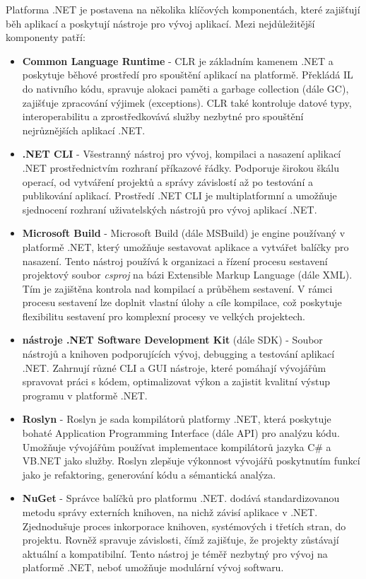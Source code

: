 
Platforma .NET je postavena na několika klíčových komponentách, které zajišťují běh aplikací a poskytují nástroje pro vývoj aplikací. Mezi nejdůležitější komponenty patří:

\begin{itemize}
    \item \textbf{Common Language Runtime} - CLR je základním kamenem .NET a poskytuje běhové prostředí pro spouštění aplikací na platformě. Překládá IL do nativního kódu, spravuje alokaci paměti a garbage collection (dále GC), zajišťuje zpracování výjimek (exceptions). CLR také kontroluje datové typy, interoperabilitu a zprostředkovává služby nezbytné pro spouštění nejrůznějších aplikací .NET.
    \item \textbf{.NET CLI} - Všestranný nástroj pro vývoj, kompilaci a nasazení aplikací .NET prostřednictvím rozhraní příkazové řádky. Podporuje širokou škálu operací, od vytváření projektů a správy závislostí až po testování a publikování aplikací. Prostředí .NET CLI je multiplatformní a umožňuje sjednocení rozhraní uživatelských nástrojů pro vývoj aplikací .NET.
    \item \textbf{Microsoft Build} - Microsoft Build (dále MSBuild) je engine používaný v platformě .NET, který umožňuje sestavovat aplikace a vytvářet balíčky pro nasazení. Tento nástroj používá k organizaci a řízení procesu sestavení projektový soubor \emph{csproj} na bázi Extensible Markup Language (dále XML). Tím je zajištěna kontrola nad kompilací a průběhem sestavení. V rámci procesu sestavení lze doplnit vlastní úlohy a cíle kompilace, což poskytuje flexibilitu sestavení pro komplexní procesy ve velkých projektech.
    \item \textbf{nástroje .NET Software Development Kit} (dále SDK) - Soubor nástrojů a knihoven podporujících vývoj, debugging a testování aplikací .NET. Zahrnují různé CLI a GUI nástroje, které pomáhají vývojářům spravovat práci s kódem, optimalizovat výkon a zajistit kvalitní výstup programu v platformě .NET.
    \item \textbf{Roslyn} - Roslyn je sada kompilátorů platformy .NET, která poskytuje bohaté Application Programming Interface (dále API) pro analýzu kódu. Umožňuje vývojářům používat implementace kompilátorů jazyka C\# a VB.NET jako služby. Roslyn zlepšuje výkonnost vývojářů poskytnutím funkcí jako je refaktoring, generování kódu a sémantická analýza.
    \item \textbf{NuGet} - Správce balíčků pro platformu .NET. dodává standardizovanou metodu správy externích knihoven, na nichž závisí aplikace v .NET. Zjednodušuje proces inkorporace knihoven, systémových i třetích stran, do projektu. Rovněž spravuje závislosti, čímž zajišťuje, že projekty zůstávají aktuální a kompatibilní. Tento nástroj je téměř nezbytný pro vývoj na platformě .NET, neboť umožňuje modulární vývoj softwaru. \cite{netdocs}
\end{itemize}


